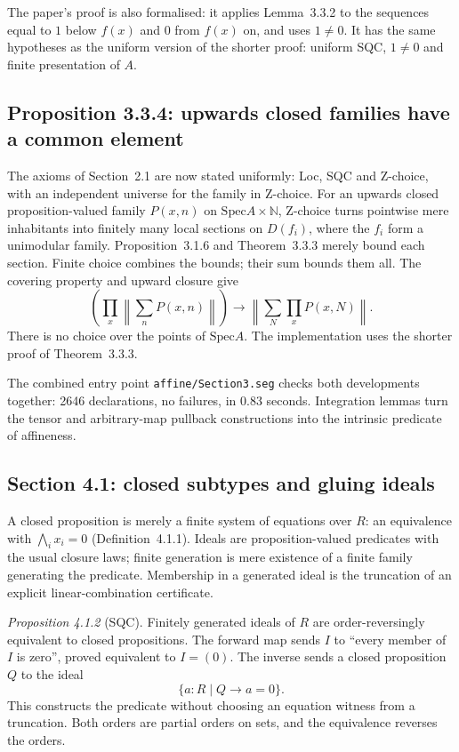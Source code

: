 \documentclass[11pt]{article}
\newcommand{\kw}[1]{\texttt{#1}}
\newcommand{\Spec}{\mathrm{Spec}}
\theoremstyle{remark}
\begin{document}
The paper's proof is also formalised: it applies Lemma~3.3.2 to the
sequences equal to $1$ below $f(x)$ and $0$ from $f(x)$ on, and uses
$1\ne0$. It has the same hypotheses as the uniform version of the
shorter proof: uniform SQC, $1\neq 0$ and finite presentation of $A$.

\subsection*{Proposition 3.3.4: upwards closed families have a common element}

The axioms of Section~2.1 are now stated
uniformly: Loc, SQC and Z-choice, with an independent universe for the
family in Z-choice. For an upwards closed proposition-valued family
$P(x,n)$ on $\Spec A\times\mathbb N$, Z-choice turns pointwise mere
inhabitants into finitely many local sections on $D(f_i)$, where the
$f_i$ form a unimodular family. Proposition~3.1.6 and Theorem~3.3.3
merely bound each section. Finite choice combines the bounds; their
sum bounds them all. The covering property and upward closure give
\[
 \left(\prod_x\left\lVert\sum_n P(x,n)\right\rVert\right)
 \longrightarrow
 \left\lVert\sum_N\prod_x P(x,N)\right\rVert .
\]
There is no choice over the points of $\Spec A$. The implementation
uses the shorter proof of Theorem~3.3.3.

The combined entry point \kw{affine/Section3.seg} checks both
developments together: 2646 declarations, no failures, in $0.83$ seconds.
Integration lemmas turn the tensor and arbitrary-map pullback
constructions into the intrinsic predicate of affineness.

\subsection*{Section 4.1: closed subtypes and gluing ideals}

A closed proposition is merely a finite system of equations over $R$:
an equivalence with $\bigwedge_i x_i=0$ (Definition~4.1.1).
Ideals are proposition-valued predicates with the usual closure laws;
finite generation is mere existence of a finite family generating the
predicate. Membership in a generated ideal is the truncation of an
explicit linear-combination certificate.

\emph{Proposition 4.1.2} (SQC). Finitely generated ideals of $R$ are
order-reversingly equivalent to closed propositions. The forward map
sends $I$ to ``every member of $I$ is zero'', proved equivalent to
$I=(0)$. The inverse sends a closed proposition $Q$ to the ideal
\[
                   \{a:R\mid Q\to a=0\}.
\]
This constructs the predicate without choosing an equation witness from
a truncation. Both orders are partial orders on sets, and the equivalence
reverses the orders.
\end{document}
